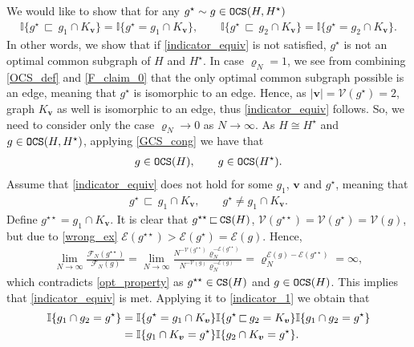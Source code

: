 \documentclass[11pt,reqno]{amsart}
\numberwithin{equation}{section}
\newcommand{\abs}[1]{\left\lvert #1 \right\rvert}
\newcommand{\kb}[1]{\boldsymbol{#1}}
\newcommand{\vk}[1]{\kb{#1}}
\begin{document}
We would like to show that {for any $g^{\star}\sim g\in{\tt OCS}(H,H^{\star})$}
\begin{align}
    \mathbb{I}\{g^{\star}{\,\sqsubset\,} g_1\cap K_{\vk v}\} = \mathbb{I}\{g^{\star}= g_1\cap K_{\vk v}\},\qquad \mathbb{I}\{g^{\star}{\,\sqsubset\,} g_2\cap K_{\vk v}\} = \mathbb{I}\{g^{\star}= g_2\cap K_{\vk v}\}.\label{indicator_equiv}
\end{align}
{In other words, we show that if \eqref{indicator_equiv} is not satisfied, $g^{\star}$ is not an optimal common subgraph of $H$ and $H^{\star}$. In case $\varrho_N=1$, we see from combining \eqref{OCS_def} and \eqref{F_claim_0} that the only optimal common subgraph possible is an edge, meaning that $g^{\star}$ is isomorphic to an edge. Hence, as $\abs{\vk v} = \mathcal{V}(g^{\star})=2$, graph $K_{\vk v}$ as well is isomorphic to an edge, thus \eqref{indicator_equiv} follows.} So, we need to consider only the case $\varrho_N\to 0$ as $N\to\infty$. As ${H}\cong {H^{\star}}$ and $g\in{\tt OCS}({H},{H^{\star}})$, applying \eqref{GCS_cong} we have that
\begin{align*}
    g\in{\tt OCS}({H}),\qquad  g\in{\tt OCS}({H^{\star}}).
\end{align*}
Assume that \eqref{indicator_equiv} does not hold for some $g_1$, $\vk v$ and $g^{\star}$, meaning that
\begin{align}
    g^{\star}{\,\sqsubset\,} g_1\cap K_{\vk v},\qquad g^{\star}\not= g_1\cap K_{\vk v}.\label{wrong_ex}
\end{align}
Define $g^{\star\star} = g_1\cap K_{\vk v}$. It is clear that $g^{\star\star}{\,\sqsubset\,}{\tt CS}({H})$, $\mathcal{V}(g^{\star\star}) = \mathcal{V}(g^{\star}) = \mathcal{V}(g)$, but due to \eqref{wrong_ex} $\mathcal{E}(g^{\star\star}) > {\mathcal{E}(g^{\star}) = \mathcal{E}(g)}$. Hence,
\begin{align*}
    \lim_{N\to\infty}\frac{\mathcal{F}_N(g^{\star\star})}{\mathcal{F}_N(g)} = \lim_{N\to\infty}\frac{N^{-\mathcal{V}(g^{\star\star})}\varrho_N^{-\mathcal{E}(g^{\star\star})}}{N^{-\mathcal{V}(g)}\varrho_N^{-\mathcal{E}(g)}} = \varrho_N^{\mathcal{E}(g) - \mathcal{E}(g^{\star\star})} = \infty,
\end{align*}
which contradicts \eqref{opt_property} as $g^{\star\star}\in{\tt CS}({H})$ and $g\in{\tt OCS}({H})$.
This implies that \eqref{indicator_equiv} is met. Applying it to \eqref{indicator_1} we obtain that 
\begin{align}
    \mathbb{I}\{g_1\cap g_2 = g^{\star}\} &= \mathbb{I}\{g^{\star}= g_1\cap K_{\vk v}\}\mathbb{I}\{g^{\star}{\,\sqsubset\,} g_2= K_{\vk v}\}\mathbb{I}\{g_1\cap g_2 = g^{\star}\}\notag\\
    &=\mathbb{I}\{g_1\cap K_{\vk v} = g^{\star}\} \mathbb{I}\{g_2\cap K_{\vk v} = g^{\star}\}.\label{indicator_2}
\end{align}
\end{document}
